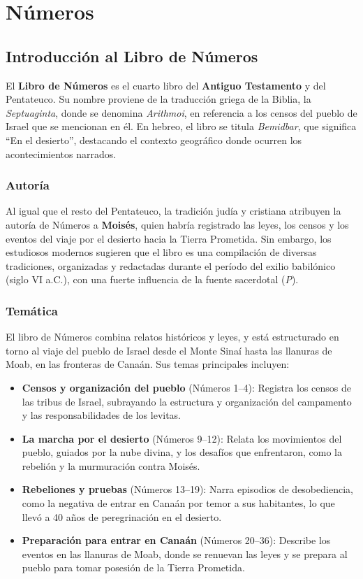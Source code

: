 
\chapter{Números}


\section*{Introducción al Libro de Números}

El \textbf{Libro de Números} es el cuarto libro del \textbf{Antiguo Testamento} y del Pentateuco. Su nombre proviene de la traducción griega de la Biblia, la \textit{Septuaginta}, donde se denomina \textit{Arithmoi}, en referencia a los censos del pueblo de Israel que se mencionan en él. En hebreo, el libro se titula \textit{Bemidbar}, que significa ``En el desierto'', destacando el contexto geográfico donde ocurren los acontecimientos narrados.

\subsection*{Autoría}

Al igual que el resto del Pentateuco, la tradición judía y cristiana atribuyen la autoría de Números a \textbf{Moisés}, quien habría registrado las leyes, los censos y los eventos del viaje por el desierto hacia la Tierra Prometida. Sin embargo, los estudiosos modernos sugieren que el libro es una compilación de diversas tradiciones, organizadas y redactadas durante el período del exilio babilónico (siglo VI a.C.), con una fuerte influencia de la fuente sacerdotal (\textit{P}).

\subsection*{Temática}

El libro de Números combina relatos históricos y leyes, y está estructurado en torno al viaje del pueblo de Israel desde el Monte Sinaí hasta las llanuras de Moab, en las fronteras de Canaán. Sus temas principales incluyen:
\begin{itemize}
	\item \textbf{Censos y organización del pueblo} (Números 1–4): Registra los censos de las tribus de Israel, subrayando la estructura y organización del campamento y las responsabilidades de los levitas.
	\item \textbf{La marcha por el desierto} (Números 9–12): Relata los movimientos del pueblo, guiados por la nube divina, y los desafíos que enfrentaron, como la rebelión y la murmuración contra Moisés.
	\item \textbf{Rebeliones y pruebas} (Números 13–19): Narra episodios de desobediencia, como la negativa de entrar en Canaán por temor a sus habitantes, lo que llevó a 40 años de peregrinación en el desierto.
	\item \textbf{Preparación para entrar en Canaán} (Números 20–36): Describe los eventos en las llanuras de Moab, donde se renuevan las leyes y se prepara al pueblo para tomar posesión de la Tierra Prometida.
\end{itemize}



